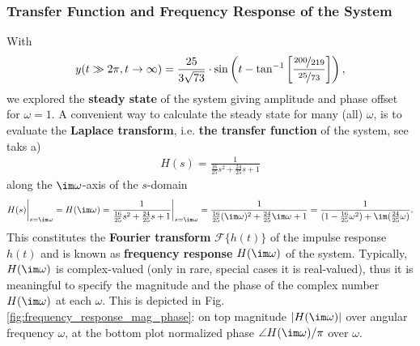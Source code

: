 \subsubsection{Transfer Function and Frequency Response of the System}
%
With 
\begin{align}
y(t\gg 2\pi, t\to\infty) = \frac{25}{3 \sqrt{73}}\cdot
\sin\left(t-\tan^{-1}
\left[\frac{\nicefrac{200}{219}}{\nicefrac{25}{73}}\right]\right),
\end{align}
we explored the \textbf{steady state} of the system giving
amplitude and phase offset for $\omega=1$.
%
A convenient way to calculate the steady state for many (all) $\omega$, is to evaluate
the \textbf{Laplace transform}, i.e. \textbf{the transfer function} of the system,
see taks a)
\begin{align}
H(s) = \frac{1}{\frac{16}{25} s^2 + \frac{24}{25} s + 1}
\end{align}
along the
$\im\omega$-axis of the $s$-domain
\begin{align}
H(s)\bigg|_{s=\im\omega} =
H(\im\omega)
= \frac{1}{\frac{16}{25} s^2 + \frac{24}{25} s + 1}\bigg|_{s=\im\omega}
= \frac{1}{\frac{16}{25} (\im\omega)^2 + \frac{24}{25} \im\omega + 1}
= \frac{1}{ (1 -\frac{16}{25} \omega^2) + \im (\frac{24}{25} \omega)}.
\end{align}
This constitutes the \textbf{Fourier transform} $\mathcal{F}\{h(t)\}$
of the impulse response $h(t)$ and is known as
\textbf{frequency response} $H(\im\omega)$ of the system.
%
Typically, $H(\im\omega)$ is complex-valued (only in rare, special cases
it is real-valued), thus it is meaningful to specify the magnitude and the phase
of the complex number $H(\im\omega)$ at each $\omega$.
%
This is depicted in Fig. \ref{fig:frequency_response_mag_phase}: on top magnitude
$|H(\im\omega)|$ over angular frequency $\omega$, at the bottom plot normalized
phase $\angle H(\im\omega) / \pi$ over $\omega$.
%
%

